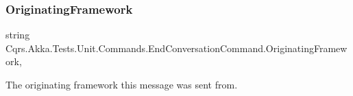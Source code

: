 \subsubsection{\texorpdfstring{Originating\+Framework}{OriginatingFramework}}
{\footnotesize\ttfamily string Cqrs.\+Akka.\+Tests.\+Unit.\+Commands.\+End\+Conversation\+Command.\+Originating\+Framework\hspace{0.3cm}{\ttfamily [get]}, {\ttfamily [set]}}



The originating framework this message was sent from. 

